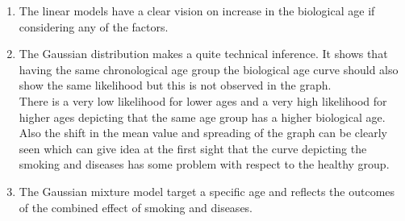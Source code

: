 \documentclass{article}
\begin{document}
\begin{enumerate}
\item The linear models have a clear vision on increase in the biological age if considering any of the factors. 
\item The Gaussian distribution makes a quite technical inference. It shows that having the same chronological age group the biological age curve should also show the same likelihood but this is not observed in the graph.
\\
There is a very low likelihood for lower ages and a very high likelihood for higher ages depicting that the same age group has a higher biological age.
\\
Also the shift in the mean value and spreading of the graph can be clearly seen which can give idea at the first sight that the curve depicting the smoking and diseases has some problem with respect to the healthy group.
\item The Gaussian mixture model target a specific age and reflects the outcomes of the combined effect of smoking and diseases.
\end{enumerate} 



\end{document}
